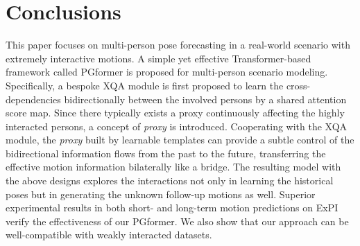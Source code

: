 \documentclass[10pt,twocolumn,letterpaper]{article}
\begin{document}
\section{Conclusions}\label{sec:conclusion}
This paper focuses on multi-person pose forecasting in a real-world scenario with extremely interactive motions. 
A simple yet effective Transformer-based framework called PGformer is proposed for multi-person scenario modeling. 
Specifically, a bespoke XQA module is first proposed to learn the cross-dependencies bidirectionally between the involved persons by a shared attention score map. 
Since there typically exists a proxy continuously affecting the highly interacted persons, a concept of \textit{proxy} is introduced. 
Cooperating with the XQA module, the \textit{proxy} built by learnable templates can provide a subtle control of the bidirectional information flows from the past to the future, transferring the effective motion information bilaterally like a bridge. 
The resulting model with the above designs explores the interactions not only in learning the historical poses but in generating the unknown follow-up motions as well. 
Superior experimental results in both short- and long-term motion predictions on ExPI verify the effectiveness of our PGformer. 
We also show that our approach can be well-compatible with weakly interacted datasets.
\end{document}
